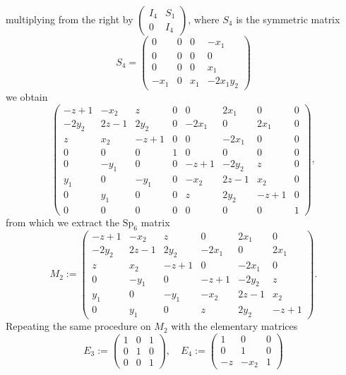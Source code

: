 \documentclass[11pt,leqno]{article}
\renewcommand{\1}{{\rm 1\hspace*{-0.4ex}%
\rule{0.1ex}{1.52ex}\hspace*{0.2ex}}}
\newcommand{\<}[1]{{\langle}#1 {\rangle}}
\theoremstyle{plain}
\theoremstyle{definition}
\theoremstyle{remark}
\numberwithin{equation}{section}
\begin{document}
multiplying from the right by $\begin{pmatrix}
    I_4 & S_1 \\ 0 & I_4
\end{pmatrix}$, where $S_4$ is the symmetric matrix 
\begin{equation*}
    S_4 = \begin{pmatrix}
        0&0&0&-x_1\\0&0&0&0\\0&0&0&x_1\\-x_1&0&x_1&-2x_1y_2
    \end{pmatrix}
\end{equation*}
we obtain 
\begin{equation*}
    \begin{pmatrix}
        -z+1& -x_2& z& 0& 0& 2x_1& 0& 0\\ -2y_2& 2z-1& 2y_2& 0& -2x_1& 0& 2x_1& 0\\ z& x_2& -z+1& 0& 0& -2x_1& 0& 0\\ 0& 0& 0& 1& 0& 0& 0& 0\\ 0& -y_1& 0& 0& -z+1& -2y_2&z& 0\\ y_1& 0& -y_1& 0& -x_2& 2z-1& x_2& 0\\ 0& y_1& 0& 0& z& 2y_2& -z+1& 0\\ 0& 0& 0& 0& 0& 0& 0& 1        
    \end{pmatrix},
\end{equation*}
from which we extract the $\mathrm{Sp}_6$ matrix 
\begin{equation*}
    M_2 := \begin{pmatrix}
        -z+1& -x_2& z& 0& 2x_1& 0\\ -2y_2& 2z-1& 2y_2& -2x_1& 0& 2x_1\\ z& x_2& -z+1& 0& -2x_1& 0\\ 0& -y_1& 0& -z+1& -2y_2& z\\ y_1& 0& -y_1& -x_2& 2z-1& x_2\\ 0& y_1& 0& z&2y_2& -z+1
    \end{pmatrix}.
\end{equation*}
Repeating the same procedure on $M_2$ with the elementary matrices 
\begin{equation*}
    E_3 := \begin{pmatrix}
        1 & 0 & 1 \\ 0 & 1 &0 \\ 0 & 0 & 1
    \end{pmatrix}, \quad E_4 := \begin{pmatrix}
        1 & 0 & 0 \\ 0 & 1 & 0 \\ -z & -x_2 & 1
    \end{pmatrix}
\end{equation*}
\end{document}
